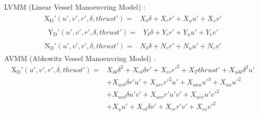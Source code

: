 \sphinxAtStartPar
LVMM (Linear Vessel Manoeuvring Model) \cite{matusiak_dynamics_2017}:
\begin{equation}\label{equation:02.01_VMMs:eqxlinear}
\begin{split}\begin{split}
\operatorname{X_{D}'}{\left(u',v',r',\delta,thrust' \right)} = & X_{\delta} \delta + X_{r} r' + X_{u} u' + X_{v} v' 
\end{split}\end{split}
\end{equation}\begin{equation}\label{equation:02.01_VMMs:eqylinear}
\begin{split}\begin{split}
\operatorname{Y_{D}'}{\left(u',v',r',\delta,thrust' \right)} = & Y_{\delta} \delta + Y_{r} r' + Y_{u} u' + Y_{v} v' 
\end{split}\end{split}
\end{equation}\begin{equation}\label{equation:02.01_VMMs:eqnlinear}
\begin{split}\begin{split}
\operatorname{N_{D}'}{\left(u',v',r',\delta,thrust' \right)} = & N_{\delta} \delta + N_{r} r' + N_{u} u' + N_{v} v' 
\end{split}\end{split}
\end{equation}
\sphinxAtStartPar
AVMM (Abkowitz Vessel Manoeuvring Model) \cite{abkowitz_ship_1964}:
\begin{equation}\label{equation:02.01_VMMs:eqxabkowitz}
\begin{split}
\operatorname{X_{D}'}{\left(u',v',r',\delta,thrust' \right)} = & X_{\delta\delta} \delta^{2} + X_{r\delta} \delta r' + X_{rr} r'^{2} + X_{T} thrust' + X_{u\delta\delta} \delta^{2} u' \\ 
& + X_{ur\delta} \delta r' u' + X_{urr} r'^{2} u' + X_{uuu} u'^{3} + X_{uu} u'^{2} \\ 
& + X_{uv\delta} \delta u' v' + X_{uvr} r' u' v' + X_{uvv} u' v'^{2} \\
& + X_{u} u' + X_{v\delta} \delta v' + X_{vr} r' v' + X_{vv} v'^{2} 
\end{split}
\end{equation}

